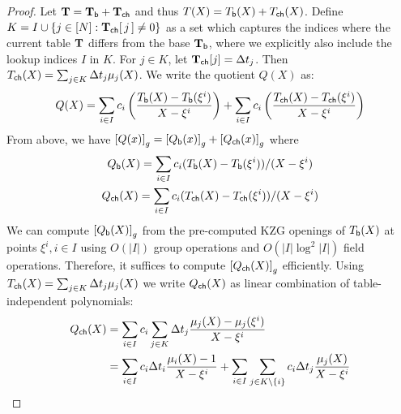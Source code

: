 \begin{proof}
    Let $\mathbf{T}=\mathbf{T}_{\mathsf{b}}+\mathbf{T}_{\mathsf{ch}}$ and thus $T(X)=T_{\mathsf{b}}({X})+T_{\mathsf{ch}}({X})$.
    Define $K=I\cup \{j\in [N]: \mathbf{T}_{\mathsf{ch}}[\,j\,]\neq 0\}$ as a set which captures the indices where the current table $\mathbf{T}$ differs from the base $\mathbf{T}_{\mathsf{b}}$,
    where we explicitly also include the lookup indices $I$ in $K$. For $j\in K$, let $\mathbf{T}_{\mathsf{ch}}[j]=\Delta t_j$. Then $T_{\mathsf{ch}}({X})=\sum_{j\in K}\Delta t_j\mu_j(X)$.
    We write the quotient $Q(X)$ as:
        {
    \begin{equation*}
        \begin{aligned}
            Q(X) = \sum_{i\in I}c_i\left(\frac{T_{\mathsf{b}}({X}) - T_{\mathsf{b}}({\xi^i})}{X-\xi^i}\right)
            + \sum_{i\in I}c_i\left(\frac{T_{\mathsf{ch}}({X}) - T_{\mathsf{ch}}({\xi^i})}{X-\xi^i}\right)
        \end{aligned}
    \end{equation*}
    }
    From above, we have $\left[{Q(x)}\right]_g=\left[{Q_{\mathsf{b}}({x})}\right]_g+\left[{Q_{\mathsf{ch}}({x})}\right]_g$ where
    \begin{gather*}
        Q_{\mathsf{b}}({X})=\sum_{i\in I}c_i (T_{\mathsf{b}}({X})-T_{\mathsf{b}}({\xi^i}))/(X-\xi^i) \\
        Q_{\mathsf{ch}}({X})=\sum_{i\in I}c_i(T_{\mathsf{ch}}({X})-T_{\mathsf{ch}}({\xi^i}))/(X-\xi^i)
    \end{gather*}
    We can compute
    $\left[{Q_{\mathsf{b}}({X})}\right]_g$ from the pre-computed KZG openings of $T_{\mathsf{b}}({X})$ at points $\xi^i,i\in I$ using $O(|I|)$ group operations and
    $O(|I|\log^2 |I|)$ field operations. Therefore, it suffices to compute $\left[{Q_{\mathsf{ch}}({X})}\right]_g$ efficiently.
    Using $T_{\mathsf{ch}}({X})=\sum_{j\in K}\Delta t_j\mu_j(X)$
    we write $Q_{\mathsf{ch}}({X})$ as linear combination of table-independent polynomials:
    \begin{align*}
        Q_{\mathsf{ch}}({X}) &= \sum_{i\in I} c_i\sum_{j\in K} \Delta t_j\frac{\mu_j(X)-\mu_j(\xi^i)}{X-\xi^i} \\
        &= \sum_{i\in I} c_i\Delta t_i\frac{\mu_i(X) - 1}{X-\xi^i} + \sum_{i\in I}\sum_{j\in K\setminus\{i\}}c_i\Delta t_j\frac{\mu_j(X)}{X-\xi^i}
    \end{align*}

\end{proof}
